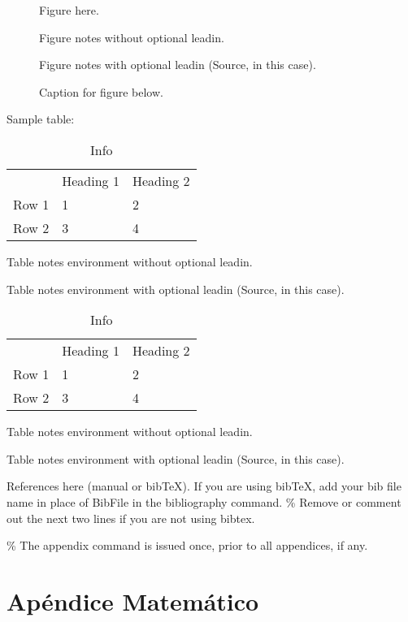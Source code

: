 \documentclass[AER]{AEA}
\begin{document}
\begin{figure}
Figure here.

\caption{Caption for figure below.}
\begin{figurenotes}
Figure notes without optional leadin.
\end{figurenotes}
\begin{figurenotes}
Figure notes with optional leadin (Source, in this case).
\end{figurenotes}
\end{figure}

Sample table:

\begin{table}
\caption{Info}

\begin{tabular}{lll}
& Heading 1 & Heading 2 \\
Row 1 & 1 & 2 \\
Row 2 & 3 & 4%
\end{tabular}
\begin{tablenotes}
Table notes environment without optional leadin.
\end{tablenotes}
\begin{tablenotes}
Table notes environment with optional leadin (Source, in this case).
\end{tablenotes}
\end{table}

\begin{table}
\caption{Info}

\begin{tabular}{lll}
& Heading 1 & Heading 2 \\
Row 1 & 1 & 2 \\
Row 2 & 3 & 4%
\end{tabular}
\begin{tablenotes}
Table notes environment without optional leadin.
\end{tablenotes}
\begin{tablenotes}[Fuente]
Table notes environment with optional leadin (Source, in this case).
\end{tablenotes}
\end{table}

References here (manual or bibTeX). If you are using bibTeX, add your
bib file name in place of BibFile in the bibliography command. \% Remove
or comment out the next two lines if you are not using bibtex.




\% The appendix command is issued once, prior to all appendices, if any.
\appendix

\section{Apéndice Matemático}
\end{document}
